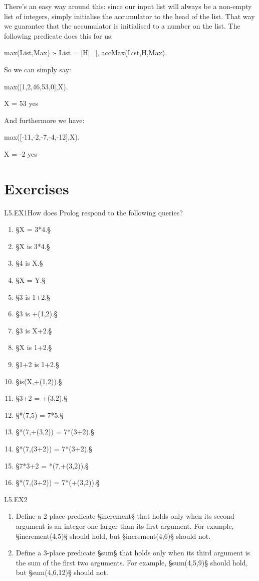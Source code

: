 There's an easy way around this: since our input list will always be a
non-empty list of integers, simply initialise the accumulator to the
head of the list.  That way we guarantee that the accumulator is
initialised to a number on the list.  The following predicate does
this for us:
\begin{LPNcodedisplay}
max(List,Max) :-
     List = [H|_],
     accMax(List,H,Max).
\end{LPNcodedisplay}
So we can simply say:
\begin{LPNcodedisplay}
max([1,2,46,53,0],X).

X = 53
yes
\end{LPNcodedisplay}
And furthermore we have:
\begin{LPNcodedisplay}
max([-11,-2,-7,-4,-12],X).

X = -2
yes
\end{LPNcodedisplay}


\newpage
\section{Exercises}\label{SEC.L5.EXERCISES}

\begin{LPNexercise}{L5.EX1}How does Prolog respond to the following queries?
\begin{enumerate}
\item{}§X = 3*4.§
\item{}§X is 3*4.§
\item{}§4 is X.§
\item{}§X = Y.§
\item{}§3 is 1+2.§
\item{}§3 is +(1,2).§
\item{}§3 is X+2.§
\item{}§X is 1+2.§
\item{}§1+2 is 1+2.§
\item{}§is(X,+(1,2)).§
\item{}§3+2 = +(3,2).§
\item{}§*(7,5) = 7*5.§
\item{}§*(7,+(3,2)) = 7*(3+2).§
\item{}§*(7,(3+2)) = 7*(3+2).§
\item{}§7*3+2 = *(7,+(3,2)).§
\item{}§*(7,(3+2)) = 7*(+(3,2)).§
\end{enumerate}
\end{LPNexercise}
\begin{LPNexercise}{L5.EX2}\begin{enumerate}
\item{}Define a 2-place predicate §increment§ that holds only when its
second argument is an integer one larger than its first argument.  For
example, §increment(4,5)§ should hold, but §increment(4,6)§
should not.
\item{}Define a 3-place predicate §sum§ that holds only when its third
argument is the sum of the first two arguments. For example,
§sum(4,5,9)§ should hold, but §sum(4,6,12)§ should
not.
\end{enumerate}
\end{LPNexercise}

